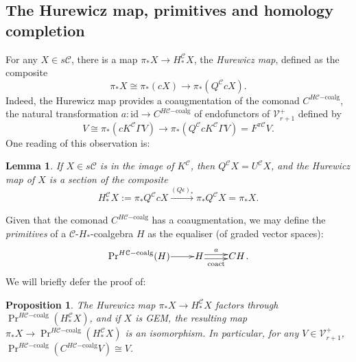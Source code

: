 \documentclass[11pt]{amsart} \renewcommand{\baselinestretch}{1.4}
\theoremstyle{plain}
\newtheorem{lem}[thm]{Lemma}
\newtheorem{prop}[thm]{Proposition}
\theoremstyle{definition}
\DeclareMathOperator{\Prim}{Pr}
\renewcommand{\to}{\longrightarrow}
\newcommand{\calV}{\mathcal{V}}
\newcommand{\calc}{\mathcal{C}}
\newcommand{\vect}[2]{\calV^{#1}_{#2}}
\newcommand{\PA}[1]{\pi#1}
\newcommand{\HC}[1]{H#1\mathrm{-coalg}}
\newcommand{\Id}{\mathrm{id}}
\begin{document}
\begin{Pi-algebras and cohomology algebras}
\subsection{The Hurewicz map, primitives and homology completion}\label{The Hurewicz map, primitives and homology completion}
For any $X\in s\calc$, there is a map $\pi_*X\to H_*^{\calc}X$, the \emph{Hurewicz map}, defined as the composite
\[\pi_*X\cong \pi_*(cX)\to \pi_*(Q^{\calc}cX).\]
Indeed, the Hurewicz map provides a coaugmentation of the comonad $C^{\HC{\calc}}$, the natural transformation $a:\Id\to C^{\HC{\calc}}$ of endofunctors of $\vect{+}{r+1}$ defined by
\[V\cong \pi_*(cK^{\calc}\Gamma  V)\to \pi_*(Q^{\calc}cK^{\calc}\Gamma  V)=F^{\PA{\calc}}V.\]
One reading of this observation is:
\begin{lem}
\label{hurewicz is a section}
If $X\in s\calc$ is in the image of $K^\calc$, then $Q^\calc X=U^{\calc}X$, and the Hurewicz map of $X$ is a section of the composite
\[H_*^{\calc}X:=\pi_*Q^{\calc}cX\overset{(Q\epsilon)_*}{\to}\pi_*Q^{\calc}X=\pi_*X.\]
\end{lem}
Given that the comonad $C^{\HC{\calc}}$ has a coaugmentation, we may define the \emph{primitives} of a $\calc$-$H_*$-coalgebra $H$ as the equaliser (of graded vector spaces):
\[\xymatrix@R=4mm@1{
\Prim^{\HC{\calc}}(H)\ar[r]
&%
H\ar@<.5ex>[r]^-{a}
\ar@<-.5ex>[r]_-{\textup{coact}}
&%
CH%
}.\]
We will briefly defer the proof of:
\begin{prop}
\label{hurewicz}
The Hurewicz map $\pi_*X\to H_*^{\calc}X$ factors through $\Prim^{\HC{\calc}}(H_*^{\calc}X)$, and if $X$ is GEM, the resulting map $\pi_*X\to\Prim^{\HC{\calc}}(H_*^\calc X)$ is an isomorphism. In particular, for any $V\in\vect{+}{r+1}$, $\Prim^{\HC{\calc}}(C^{\HC{\calc}}V)\cong V$.
\end{prop}


\end{Pi-algebras and cohomology algebras}
\end{document}
